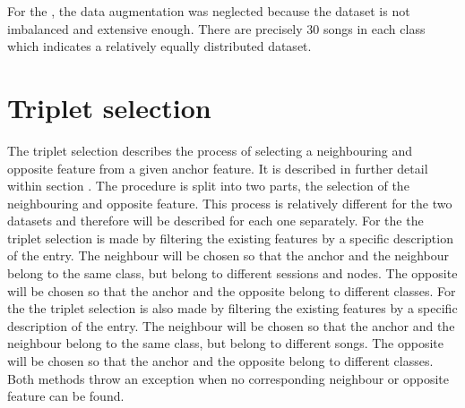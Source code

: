 \newline
\newline
For the , the data augmentation was neglected because the dataset is not imbalanced and extensive enough. There are precisely 30 songs in each class which indicates a relatively equally distributed dataset.

\section{Triplet selection}
\label{sec:Triplet-Selection}

The triplet selection describes the process of selecting a neighbouring and opposite feature from a given anchor feature. It is described in further detail within section . The procedure is split into two parts, the selection of the neighbouring and opposite feature. This process is relatively different for the two datasets and therefore will be described for each one separately.
\newline
\newline
For the  the triplet selection is made by filtering the existing features by a specific description of the entry. The neighbour will be chosen so that the anchor and the neighbour belong to the same class, but belong to different sessions and nodes. The opposite will be chosen so that the anchor and the opposite belong to different classes.
\newline
\newline
For the  the triplet selection is also made by filtering the existing features by a specific description of the entry. The neighbour will be chosen so that the anchor and the neighbour belong to the same class, but belong to different songs. The opposite will be chosen so that the anchor and the opposite belong to different classes.
\newline
\newline
Both methods throw an exception when no corresponding neighbour or opposite feature can be found.

